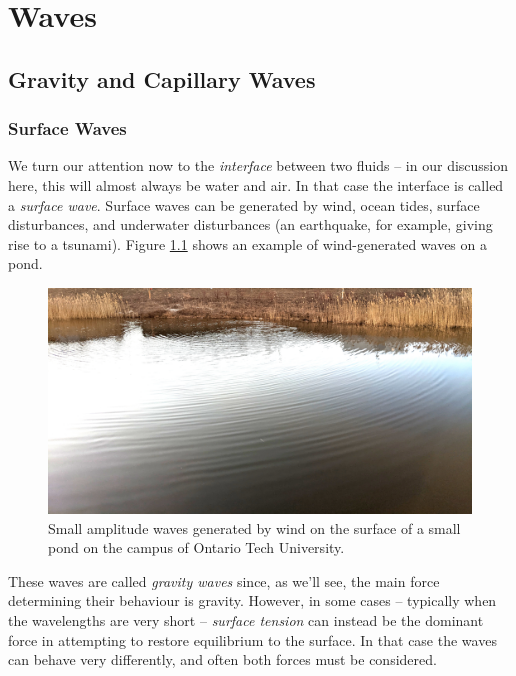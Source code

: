 \chapter{Waves}
\label{chap_waves}

%
%

\section{Gravity and Capillary Waves}



\subsection{Surface Waves}

We turn our attention now to the \emph{interface} between two fluids -- in our discussion here, this will almost always be water and air.  In that case the interface is called a \emph{surface wave}.  Surface waves can be generated by wind, ocean tides, surface disturbances, and underwater disturbances (an earthquake, for example, giving rise to a tsunami).  Figure \ref{fig_pond} shows an example of wind-generated waves on a pond.  

\begin{figure}
\centering\includegraphics[width=0.9\linewidth]{Figures/Chapter5/fig_pond_waves}
\caption{Small amplitude waves generated by wind on the surface of a small pond on the campus of Ontario Tech University.}
\label{fig_pond}
\end{figure}

These waves are called \emph{gravity waves} since, as we'll see, the main force determining their behaviour is gravity.  However, in some cases -- typically when the wavelengths are very short -- \emph{surface tension} can instead be the dominant force in attempting to restore equilibrium to the surface.  In that case the waves can behave very differently, and often both forces must be considered.

